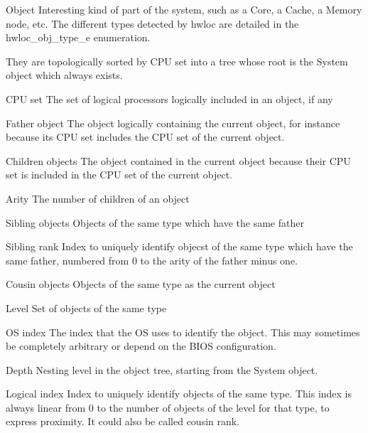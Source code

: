 
\begin{DoxyDescription}
\item[Object ]Interesting kind of part of the system, such as a Core, a Cache, a Memory node, etc. The different types detected by hwloc are detailed in the hwloc\_\-obj\_\-type\_\-e enumeration.

They are topologically sorted by CPU set into a tree whose root is the System object which always exists. 


\item[CPU set ]The set of logical processors logically included in an object, if any


\item[Father object ]The object logically containing the current object, for instance because its CPU set includes the CPU set of the current object. 


\item[Children objects ]The object contained in the current object because their CPU set is included in the CPU set of the current object.


\item[Arity ]The number of children of an object


\item[Sibling objects ]Objects of the same type which have the same father


\item[Sibling rank ]Index to uniquely identify objecst of the same type which have the same father, numbered from 0 to the arity of the father minus one.


\item[Cousin objects ]Objects of the same type as the current object


\item[Level ]Set of objects of the same type


\item[OS index ]The index that the OS uses to identify the object. This may sometimes be completely arbitrary or depend on the BIOS configuration.


\item[Depth ]Nesting level in the object tree, starting from the System object.


\item[Logical index ]Index to uniquely identify objects of the same type. This index is always linear from 0 to the number of objects of the level for that type, to express proximity. It could also be called cousin rank.


\end{DoxyDescription}

